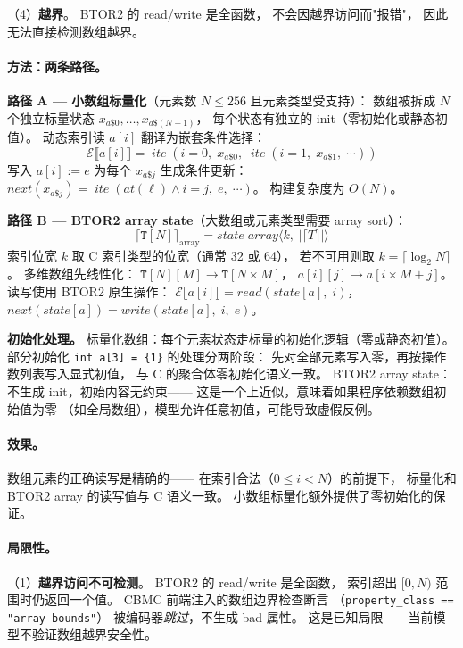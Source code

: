 \documentclass[11pt,a4paper]{article}
\newcommand{\ite}{\mathop{\mathit{ite}}}
\begin{document}
（4）\textbf{越界}。
BTOR2 的 read/write 是全函数，
不会因越界访问而"报错"，
因此无法直接检测数组越界。

\paragraph{方法：两条路径。}

\textbf{路径 A — 小数组标量化}（元素数 $N \leq 256$ 且元素类型受支持）：
数组被拆成 $N$ 个独立标量状态
$x_{a\$0}, \ldots, x_{a\$(N{-}1)}$，
每个状态有独立的 init（零初始化或静态初值）。
动态索引读 $a[i]$ 翻译为嵌套条件选择：
\[
\mathcal{E}\llbracket a[i] \rrbracket
= \ite(i{=}0,\; x_{a\$0},\; \ite(i{=}1,\; x_{a\$1},\; \cdots))
\]
写入 $a[i] := e$ 为每个 $x_{a\$j}$ 生成条件更新：
$\mathit{next}(x_{a\$j}) = \ite(\mathit{at}(\ell) \wedge i{=}j,\; e,\; \cdots)$。
构建复杂度为 $O(N)$。

\textbf{路径 B — BTOR2 array state}（大数组或元素类型需要 array sort）：
\[
\lceil \texttt{T}[N] \rceil_{\mathrm{array}}
= \mathit{state}\;\mathit{array}\langle k,\; |\lceil T \rceil| \rangle
\]
索引位宽 $k$ 取 C 索引类型的位宽（通常 32 或 64），
若不可用则取 $k = \lceil \log_2 N \rceil$。
多维数组先线性化：
$\texttt{T}[N][M] \to \texttt{T}[N{\times}M]$，
$a[i][j] \to a[i \times M + j]$。
读写使用 BTOR2 原生操作：
$\mathcal{E}\llbracket a[i] \rrbracket = \mathit{read}(\mathit{state}[a],\; i)$，
$\mathit{next}(\mathit{state}[a]) = \mathit{write}(\mathit{state}[a],\; i,\; e)$。

\textbf{初始化处理。}
标量化数组：每个元素状态走标量的初始化逻辑（零或静态初值）。
部分初始化 \texttt{int a[3] = \{1\}} 的处理分两阶段：
先对全部元素写入零，再按操作数列表写入显式初值，
与 C 的聚合体零初始化语义一致。
BTOR2 array state：不生成 init，初始内容无约束——
这是一个上近似，意味着如果程序依赖数组初始值为零
（如全局数组），模型允许任意初值，可能导致虚假反例。

\paragraph{效果。}
数组元素的正确读写是精确的——
在索引合法（$0 \leq i < N$）的前提下，
标量化和 BTOR2 array 的读写值与 C 语义一致。
小数组标量化额外提供了零初始化的保证。

\paragraph{局限性。}
（1）\textbf{越界访问不可检测}。
BTOR2 的 read/write 是全函数，
索引超出 $[0, N)$ 范围时仍返回一个值。
CBMC 前端注入的数组边界检查断言
（\texttt{property\_class == "array bounds"}）
被编码器\emph{跳过}，不生成 bad 属性。
这是已知局限——当前模型不验证数组越界安全性。
\end{document}

